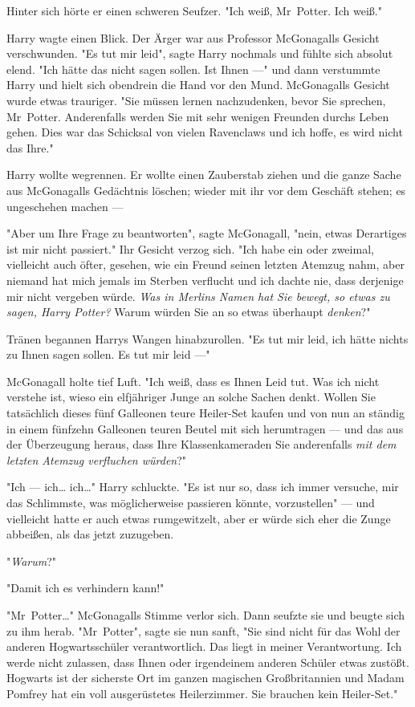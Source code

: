 {Hinter sich hörte er einen schweren Seufzer. "Ich weiß, Mr~Potter. Ich weiß."

Harry wagte einen Blick. Der Ärger war aus Professor McGonagalls Gesicht verschwunden. "Es tut mir leid", sagte Harry nochmals und fühlte sich absolut elend. "Ich hätte das nicht sagen sollen. Ist Ihnen ---" und dann verstummte Harry und hielt sich obendrein die Hand vor den Mund. McGonagalls Gesicht wurde etwas trauriger. "Sie müssen lernen nachzudenken, bevor Sie sprechen, Mr~Potter. Anderenfalls werden Sie mit sehr wenigen Freunden durchs Leben gehen. Dies war das Schicksal von vielen Ravenclaws und ich hoffe, es wird nicht das Ihre."

Harry wollte wegrennen. Er wollte einen Zauberstab ziehen und die ganze Sache aus McGonagalls Gedächtnis löschen; wieder mit ihr vor dem Geschäft stehen; es ungeschehen machen ---

"Aber um Ihre Frage zu beantworten", sagte McGonagall, "nein, etwas Derartiges ist mir nicht passiert." Ihr Gesicht verzog sich. "Ich habe ein oder zweimal, vielleicht auch öfter, gesehen, wie ein Freund seinen letzten Atemzug nahm, aber niemand hat mich jemals im Sterben verflucht und ich dachte nie, dass derjenige mir nicht vergeben würde. \emph{Was in Merlins Namen hat Sie bewegt, so etwas zu sagen, Harry Potter?} Warum würden Sie an so etwas überhaupt \emph{denken}?"

Tränen begannen Harrys Wangen hinabzurollen. "Es tut mir leid, ich hätte nichts zu Ihnen sagen sollen. Es tut mir leid ---"

McGonagall holte tief Luft. "Ich weiß, dass es Ihnen Leid tut. Was ich nicht verstehe ist, wieso ein elfjähriger Junge an solche Sachen denkt. Wollen Sie tatsächlich dieses fünf Galleonen teure Heiler-Set kaufen und von nun an ständig in einem fünfzehn Galleonen teuren Beutel mit sich herumtragen --- und das aus der Überzeugung heraus, dass Ihre Klassenkameraden Sie anderenfalls \emph{mit dem letzten Atemzug verfluchen würden}?"

"Ich --- ich… ich…" Harry schluckte. "Es ist nur so, dass ich immer versuche, mir das Schlimmste, was möglicherweise passieren könnte, vorzustellen" --- und vielleicht hatte er auch etwas rumgewitzelt, aber er würde sich eher die Zunge abbeißen, als das jetzt zuzugeben.

"\emph{Warum}?"

"Damit ich es verhindern kann!"

"Mr~Potter…" McGonagalls Stimme verlor sich. Dann seufzte sie und beugte sich zu ihm herab. "Mr~Potter", sagte sie nun sanft, "Sie sind nicht für das Wohl der anderen Hogwartsschüler verantwortlich. Das liegt in meiner Verantwortung. Ich werde nicht zulassen, dass Ihnen oder irgendeinem anderen Schüler etwas zustößt. Hogwarts ist der sicherste Ort im ganzen magischen Großbritannien und Madam Pomfrey hat ein voll ausgerüstetes Heilerzimmer. Sie brauchen kein Heiler-Set."

}
